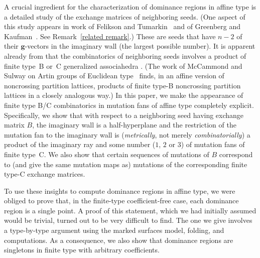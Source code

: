 \documentclass[10pt]{article}
\theoremstyle{definition}
\theoremstyle{remark}
\numberwithin{equation}{section}
\newcommand{\0}{{\mathbf{0}}}
\newcommand{\g}{\mathbf{g}}
\begin{document}
A crucial ingredient for the characterization of dominance regions in affine type is a detailed study of the exchange matrices of neighboring seeds.  
(One aspect of this study appears in work of Felikson and Tumarkin~\cite{FeTuCoeff} and of Greenberg and Kaufman~\cite{GreenbergKaufman}.
See Remark~\ref{related remark}.)
These are seeds that have $n-2$ of their $\g$-vectors in the imaginary wall (the largest possible number).
It is apparent already from \cite{affdenom} that the combinatorics of neighboring seeds involves a product of finite type~B or~C generalized associahedra \cite[Propositions~5.13, 6,13]{affdenom}.  
(The work of McCammond and Sulway on Artin groups of Euclidean type~\cite{McSul} finds, in an affine version of noncrossing partition lattices, products of finite type-B noncrossing partition lattices in a closely analogous way.)
In this paper, we make the appearance of finite type B/C combinatorics in mutation fans of affine type completely explicit.
Specifically, we show that with respect to a neighboring seed having exchange matrix $B$, the imaginary wall is a half-hyperplane and the restriction of the mutation fan to the imaginary wall is (\emph{metrically}, not merely \emph{combinatorially}) a product of the imaginary ray and some number ($1$, $2$ or $3$) of mutation fans of finite type~C.
We also show that certain sequences of mutations of $B$ correspond to (and give the same mutation maps as) mutations of the corresponding finite type-C exchange matrices.

To use these insights to compute dominance regions in affine type, we were obliged to prove that, in the finite-type coefficient-free case, each dominance region is a single point.
A proof of this statement, which we had initially assumed would be trivial, turned out to be very difficult to find.
The one we give involves a type-by-type argument using the marked surfaces model, folding, and computations.
As a consequence, we also show that dominance regions are singletons in finite type with arbitrary coefficients.
\end{document}

